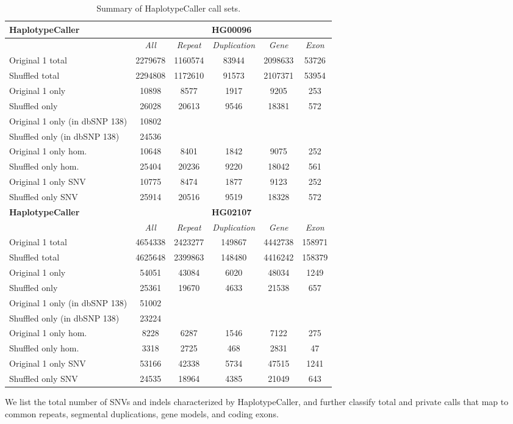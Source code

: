 \begin{table}[htb]
\caption{Summary of HaplotypeCaller call sets. }
\begin{center}
\begin{tabular}{|l|c||c|c|c|c|}
\hline
{\bf HaplotypeCaller} & \multicolumn{5}{|c|}{\bf HG00096} \\
\hline
\cline{2-6}
{\bf} & {\it All} & {\it Repeat} & {\it Duplication} & {\it Gene} & {\it Exon} \\
\hline
Original 1 total & 2279678 & 1160574 & 83944 & 2098633 & 53726\\ 
\hline
Shuffled total & 2294808 & 1172610 & 91573 & 2107371 & 53954\\ 
\hline
Original 1 only & 10898 & 8577 & 1917 & 9205 & 253\\ 
\hline
Shuffled only & 26028 & 20613 & 9546 & 18381 & 572\\ 
\hline
Original 1 only (in dbSNP 138) & 10802 &  &  &  & \\ 
\hline
Shuffled only (in dbSNP 138) & 24536 &  &  &  & \\ 
\hline
Original 1 only hom. & 10648 & 8401 & 1842 & 9075 & 252\\ 
\hline
Shuffled only hom. & 25404 & 20236 & 9220 & 18042 & 561\\ 
\hline
Original 1 only SNV & 10775 & 8474 & 1877 & 9123 & 252\\ 
\hline
Shuffled only SNV & 25914 & 20516 & 9519 & 18328 & 572\\ 
\hline
\hline
{\bf HaplotypeCaller} & \multicolumn{5}{|c|}{\bf HG02107} \\
\hline
\cline{2-6}
{\bf} & {\it All} & {\it Repeat} & {\it Duplication} & {\it Gene} & {\it Exon} \\
\hline
Original 1 total & 4654338 & 2423277 & 149867 & 4442738 & 158971\\ 
\hline
Shuffled total & 4625648 & 2399863 & 148480 & 4416242 & 158379\\ 
\hline
Original 1 only & 54051 & 43084 & 6020 & 48034 & 1249\\ 
\hline
Shuffled only & 25361 & 19670 & 4633 & 21538 & 657\\ 
\hline
Original 1 only (in dbSNP 138) & 51002 &  &  &  & \\ 
\hline
Shuffled only (in dbSNP 138) & 23224 &  &  &  & \\ 
\hline
Original 1 only hom. & 8228 & 6287 & 1546 & 7122 & 275\\ 
\hline
Shuffled only hom. & 3318 & 2725 & 468 & 2831 & 47\\ 
\hline
Original 1 only SNV & 53166 & 42338 & 5734 & 47515 & 1241\\ 
\hline
Shuffled only SNV & 24535 & 18964 & 4385 & 21049 & 643\\ 
\hline 
\end{tabular}
\end{center}
{\footnotesize We list the total number of SNVs and indels characterized by HaplotypeCaller, and further classify total and private calls that map to common repeats, segmental duplications, gene models, and coding exons.}
\label{tab:orig-vs-shuf-hc}
\end{table}

